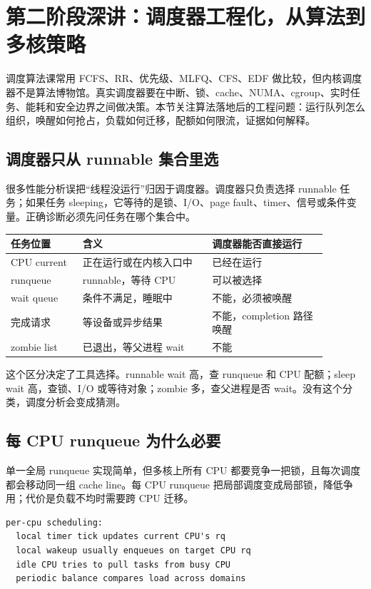 \section{第二阶段深讲：调度器工程化，从算法到多核策略}

调度算法课常用 FCFS、RR、优先级、MLFQ、CFS、EDF 做比较，但内核调度器不是算法博物馆。真实调度器要在中断、锁、cache、NUMA、cgroup、实时任务、能耗和安全边界之间做决策。本节关注算法落地后的工程问题：运行队列怎么组织，唤醒如何抢占，负载如何迁移，配额如何限流，证据如何解释。

\subsection{调度器只从 runnable 集合里选}

很多性能分析误把“线程没运行”归因于调度器。调度器只负责选择 runnable 任务；如果任务 sleeping，它等待的是锁、I/O、page fault、timer、信号或条件变量。正确诊断必须先问任务在哪个集合中。

\begin{longtable}{|p{0.2\linewidth}|p{0.36\linewidth}|p{0.32\linewidth}|}
\toprule
任务位置 & 含义 & 调度器能否直接运行 \\
\midrule
CPU current & 正在运行或在内核入口中 & 已经在运行 \\\tablerowrule
runqueue & runnable，等待 CPU & 可以被选择 \\\tablerowrule
wait queue & 条件不满足，睡眠中 & 不能，必须被唤醒 \\\tablerowrule
完成请求 & 等设备或异步结果 & 不能，completion 路径唤醒 \\\tablerowrule
zombie list & 已退出，等父进程 wait & 不能 \\
\bottomrule
\end{longtable}

这个区分决定了工具选择。runnable wait 高，查 runqueue 和 CPU 配额；sleep wait 高，查锁、I/O 或等待对象；zombie 多，查父进程是否 wait。没有这个分类，调度分析会变成猜测。

\subsection{每 CPU runqueue 为什么必要}

单一全局 runqueue 实现简单，但多核上所有 CPU 都要竞争一把锁，且每次调度都会移动同一组 cache line。每 CPU runqueue 把局部调度变成局部锁，降低争用；代价是负载不均时需要跨 CPU 迁移。

\begin{lstlisting}
per-cpu scheduling:
  local timer tick updates current CPU's rq
  local wakeup usually enqueues on target CPU rq
  idle CPU tries to pull tasks from busy CPU
  periodic balance compares load across domains
\end{lstlisting}

